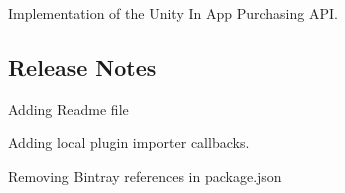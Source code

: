Implementation of the Unity In App Purchasing A\+PI.

\subsection*{Release Notes}


\begin{DoxyItemize}
\item Adding Readme file
\item Adding local plugin importer callbacks.
\item Removing Bintray references in package.\+json 
\end{DoxyItemize}